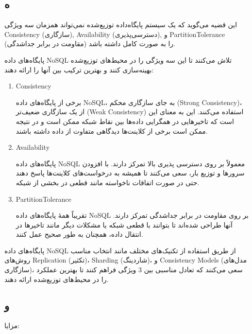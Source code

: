 \subsection*{ه}
این قضیه می‌گوید که یک سیستم پایگاه‌داده توزیع‌شده نمی‌تواند همزمان سه ویژگی Consistency (سازگاری), Availability (دسترسی‌پذیری), و PartitionTolerance (مقاومت در برابر جداشدگی) را به صورت کامل داشته باشد.

پایگاه‌های داده NoSQL تلاش می‌کنند تا این سه ویژگی را در محیط‌های توزیع‌شده بهینه‌سازی کنند و بهترین ترکیب بین آنها را ارائه دهند:

\begin{enumerate}
	\item Consistency
	
	برخی از پایگاه‌های داده NoSQL، به جای سازگاری محکم (Strong Consistency)، از یک سازگاری ضعیف‌تر (Weak Consistency) استفاده می‌کنند. این به معنای این است که تاخیرهایی در همگرایی داده‌ها بین نقاط شبکه ممکن است و در نتیجه ممکن است برخی از کلاینت‌ها دیدگاهی متفاوت از داده داشته باشند.
	\item 
	Availability
	
	پایگاه‌های داده NoSQL معمولاً بر روی دسترسی پذیری بالا تمرکز دارند. با افزودن سرورها و توزیع بار، سعی می‌کنند تا همیشه به درخواست‌های کلاینت‌ها پاسخ دهند حتی در صورت اتفاقات ناخواسته مانند قطعی در بخشی از شبکه.
	\item 
	PartitionTolerance
	
	تقریباً همهٔ پایگاه‌های داده NoSQL بر روی مقاومت در برابر جداشدگی تمرکز دارند. آنها طراحی شده‌اند تا بتوانند با قطعی شبکه یا مشکلات دیگر مانند تاخیر‌ها در انتقال داده، همچنان به طور صحیح عمل کنند.
\end{enumerate}

پایگاه‌های داده NoSQL از طریق استفاده از تکنیک‌های مختلف مانند انتخاب مناسب روش‌های Replication (تکثیر)، Sharding (شاردینگ)، و Consistency Models (مدل‌های سازگاری)، سعی می‌کنند که تعادل مناسبی بین 3 ویژگی فراهم کنند تا بهترین عملکرد را در محیط‌های توزیع‌شده ارائه دهند.
\pagebreak

\subsection*{و}
مزایا:

